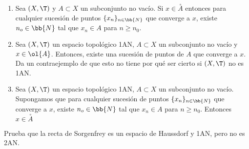 \begin{ejercicio}
\begin{enumerate}[label=\alph*)]
        \item Sea $(X,\T)$ y $A\subset X$ un subconjunto no vacío. Si $x\in \stackrel{\circ}{A}$ entonces para cualquier sucesión de puntos $\{x_n\}_{n\in \bb{N}}$ que converge a $x$, existe $n_o\in \bb{N}$ tal que $x_n\in A$ para $n\geq n_0$.

        \item Sea $(X,\T)$ un espacio topológico 1AN, $A\subset X$ un subconjunto no vacío y $x\in \ol{A}$. Entonces, existe una sucesión de puntos de $A$ que converge a $x$. Da un contraejemplo de que esto no tiene por qué ser cierto si $(X,\T)$ no es 1AN.

        \item Sea $(X,\T)$ un espacio topológico 1AN, $A\subset X$ un subconjunto no vacío. Supongamos que para cualquier sucesión de puntos $\{x_n\}_{n\in \bb{N}}$ que converge a $x$, existe $n_o\in \bb{N}$ tal que $x_n\in A$ para $n\geq n_0$. Entonces $x\in \stackrel{\circ}{A}$
    \end{enumerate}
\end{ejercicio}




\begin{ejercicio}
    Prueba que la recta de Sorgenfrey es un espacio de Haussdorf y 1AN, pero no es 2AN.
\end{ejercicio}

